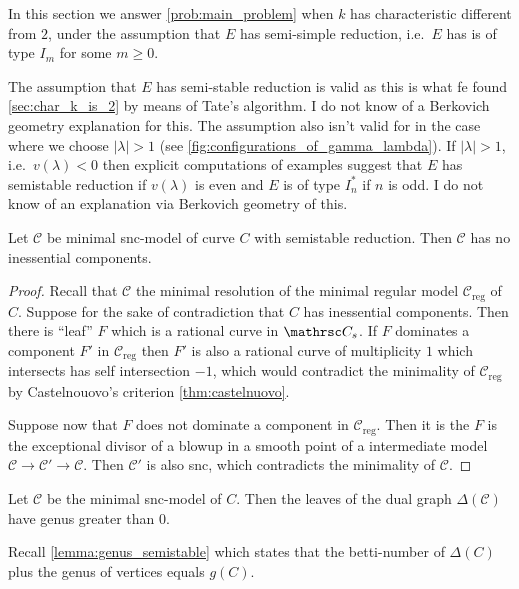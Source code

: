 In this section we answer \cref{prob:main_problem} when $k$ has characteristic different from $2$, under the assumption that $E$ has semi-simple reduction, i.e.\  $E$ has is of type $I_m$ for some $m \ge 0$. 

\begin{remark}
	The assumption that $E$ has semi-stable reduction is valid as this is what fe found \cref{sec:char_k_is_2} by means of Tate's algorithm. 
	I do not know of a Berkovich geometry explanation for this.  
	The assumption also isn't valid for in the case where we choose $|\lambda| > 1$ (see \cref{fig:configurations_of_gamma_lambda}).
	If $|\lambda| > 1$, i.e.\ $v(\lambda) < 0$ then
	explicit computations of examples suggest that  $E$ has semistable reduction if $v(\lambda)$ is even and $E$ is of type $I^*_n$ if $n$ is odd. 
	I do not know of an explanation via Berkovich geometry of this. 
\end{remark}

\begin{lemma}\label{lem:semistable_skeleton}
	Let $\mathscr C$ be minimal snc-model of curve $C$ with semistable reduction.
	Then $\mathscr C$ has no inessential components. 
\end{lemma}
\begin{proof}
	Recall that $\mathscr C$ the minimal resolution of the minimal regular model $\mathscr C_\text{reg} $ of $C$. 
	Suppose for the sake of contradiction that  $C$ has inessential components.
	Then there is ``leaf''  $F$ which is a rational curve in $\mathrsc C_s$. 
	If $F$ dominates a component $F'$ in $\mathscr C_\text{reg} $ then $F'$ is also a rational curve of multiplicity $1$ which intersects has self intersection $-1$,  which would contradict the minimality of  $\mathscr C _\text{reg} $ by Castelnouovo's criterion \cref{thm:castelnuovo}. 

	Suppose now that $F$ does not dominate a component in $\mathscr C_\text{reg} $.
	Then it is the $F$ is the exceptional divisor of a blowup in a smooth point of a intermediate model $\mathscr C \to \mathscr C' \to \mathscr C$. 
	Then $\mathscr C'$ is also snc, which contradicts the minimality of $\mathscr C$. 
\end{proof}
\begin{corollary}
	Let $\mathscr C$ be the minimal snc-model of $C$. 
	Then the leaves of the dual graph  $\Delta (\mathscr C)$ have genus greater than $0$. 
\end{corollary}

Recall \cref{lemma:genus_semistable} which states that the betti-number of $\Delta(C)$ plus the genus of vertices equals $g(C)$. 

